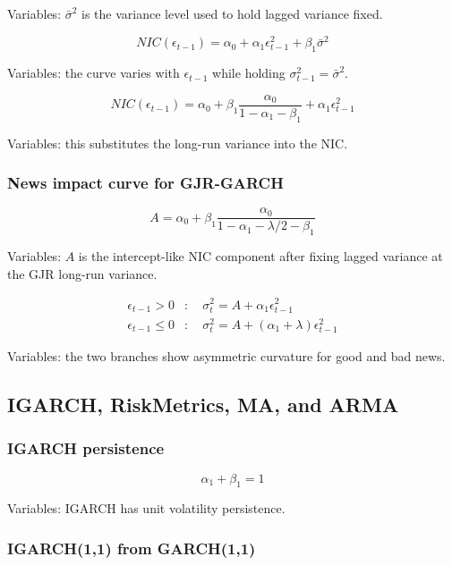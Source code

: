 \documentclass[
  8pt,
  twocolumn]{extarticle}
\begin{document}
Variables: \(\bar\sigma^2\) is the variance level used to hold lagged
variance fixed.

\[
NIC(\epsilon_{t-1})=\alpha_0+\alpha_1\epsilon_{t-1}^2+\beta_1\bar\sigma^2
\]

Variables: the curve varies with \(\epsilon_{t-1}\) while holding
\(\sigma_{t-1}^2=\bar\sigma^2\).

\[
NIC(\epsilon_{t-1})=\alpha_0+\beta_1\frac{\alpha_0}{1-\alpha_1-\beta_1}+\alpha_1\epsilon_{t-1}^2
\]

Variables: this substitutes the long-run variance into the NIC.

\subsubsection{News impact curve for
GJR-GARCH}\label{news-impact-curve-for-gjr-garch}

\[
A=\alpha_0+\beta_1\frac{\alpha_0}{1-\alpha_1-\lambda/2-\beta_1}
\]

Variables: \(A\) is the intercept-like NIC component after fixing lagged
variance at the GJR long-run variance.

\[
\begin{aligned}
\epsilon_{t-1}>0&:\quad \sigma_t^2=A+\alpha_1\epsilon_{t-1}^2\\
\epsilon_{t-1}\le0&:\quad \sigma_t^2=A+(\alpha_1+\lambda)\epsilon_{t-1}^2
\end{aligned}
\]

Variables: the two branches show asymmetric curvature for good and bad
news.

\subsection{IGARCH, RiskMetrics, MA, and
ARMA}\label{igarch-riskmetrics-ma-and-arma}

\subsubsection{IGARCH persistence}\label{igarch-persistence}

\[
\alpha_1+\beta_1=1
\]

Variables: IGARCH has unit volatility persistence.

\subsubsection{IGARCH(1,1) from GARCH(1,1)}\label{igarch11-from-garch11}
\end{document}
